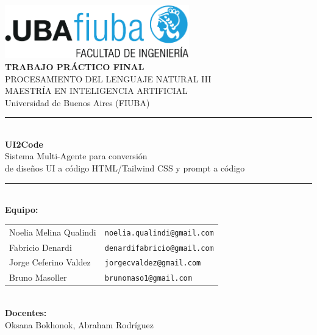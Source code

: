 \documentclass[12pt,a4paper]{article}
\begin{document}
\begin{titlepage}
    \centering

    \includegraphics[width=0.6\textwidth]{./docs/uba.png}\\[1cm]
    
    {\LARGE\bfseries TRABAJO PRÁCTICO FINAL\\[0.5cm]}
    {\Large PROCESAMIENTO DEL LENGUAJE NATURAL III\\[0.3cm]}
    {\large MAESTRÍA EN INTELIGENCIA ARTIFICIAL\\[0.2cm]}
    {\large Universidad de Buenos Aires (FIUBA)\\[1cm]}
    
    \rule{\textwidth}{1.5pt}\\[0.4cm]
    {\Huge\bfseries UI2Code\\[0.2cm]}
    {\LARGE Sistema Multi-Agente para conversión\\[0.1cm] de diseños UI a código HTML/Tailwind CSS y prompt a código\\[0.2cm]}
    \rule{\textwidth}{1pt}\\[1cm]
    
    {\large\bfseries Equipo:\\[0.3cm]}
    \begin{tabular}{ll}
        Noelia Melina Qualindi & \texttt{noelia.qualindi@gmail.com} \\
        Fabricio Denardi & \texttt{denardifabricio@gmail.com} \\
        Jorge Ceferino Valdez & \texttt{jorgecvaldez@gmail.com} \\
        Bruno Masoller & \texttt{brunomaso1@gmail.com}
    \end{tabular}\\[1cm]
    
    {\large\bfseries Docentes:\\[0.3cm]}
    Oksana Bokhonok, Abraham Rodríguez\\[1cm]
    

\end{titlepage}
\end{document}
